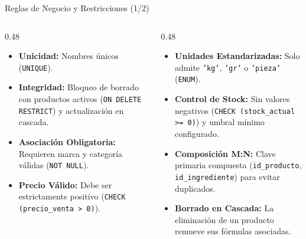 \documentclass[10pt,aspectratio=169]{beamer}
\begin{document}
\begin{frame}{Reglas de Negocio y Restricciones (1/2)}
    \begin{columns}[T]
        \begin{column}{0.48\textwidth}
            \begin{itemize}
                \item \textbf{Unicidad:} Nombres únicos (\texttt{UNIQUE}).
                \item \textbf{Integridad:} Bloqueo de borrado con productos activos (\texttt{ON DELETE RESTRICT}) y actualización en cascada.
            \end{itemize}

            \vspace{0.2cm}
            \begin{itemize}
                \item \textbf{Asociación Obligatoria:} Requieren marca y categoría válidas (\texttt{NOT NULL}).
                \item \textbf{Precio Válido:} Debe ser estrictamente positivo (\texttt{CHECK (precio\_venta > 0)}).
            \end{itemize}
        \end{column}

        \begin{column}{0.48\textwidth}
            \begin{itemize}
                \item \textbf{Unidades Estandarizadas:} Solo admite \texttt{'kg'}, \texttt{'gr'} o \texttt{'pieza'} (\texttt{ENUM}).
                \item \textbf{Control de Stock:} Sin valores negativos (\texttt{CHECK (stock\_actual >= 0)}) y umbral mínimo configurado.
                \item \textbf{Composición M:N:} Clave primaria compuesta (\texttt{id\_producto}, \texttt{id\_ingrediente}) para evitar duplicados.
                \item \textbf{Borrado en Cascada:} La eliminación de un producto remueve sus fórmulas asociadas.
            \end{itemize}
        \end{column}
    \end{columns}
\end{frame}
\end{document}
